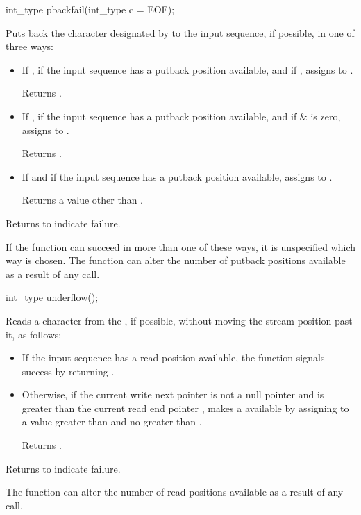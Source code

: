 %
\begin{itemdecl}
int_type pbackfail(int_type c = EOF);
\end{itemdecl}

\begin{itemdescr}
\pnum
Puts back the character designated by  to the input
sequence, if possible, in one of three ways:
\begin{itemize}
\item
If
,
if the input sequence has a putback position available, and if
,
assigns
to .

\pnum
Returns .
\item
If
,
if the input sequence has a putback position available, and if
 \&  is zero,
assigns  to
.

\pnum
Returns
.
\item
If
and if the input sequence has a putback position available,
assigns
to .

\pnum
Returns a value other than
.
\end{itemize}

\pnum
Returns
to indicate failure.

\pnum
\notes
If the function can succeed in more than one of these ways, it is
unspecified which way is chosen.
%
The function can alter the number of putback
positions available as a result of any call.
\end{itemdescr}

%
\begin{itemdecl}
int_type underflow();
\end{itemdecl}

\begin{itemdescr}
\pnum
\effects
Reads a character from the
,
if possible, without moving the stream position past it, as follows:
\begin{itemize}
\item
If the input sequence has a read position available, the function
signals success by returning
.
\item
Otherwise, if
the current write next pointer  is not a null pointer and
is greater than the current read end pointer ,
makes a
available by
assigning to  a value greater than  and
no greater than .

\pnum
Returns .
\end{itemize}

\pnum
Returns
to indicate failure.

\pnum
\notes
The function can alter the number of read positions available as a
result of any call.
\end{itemdescr}

